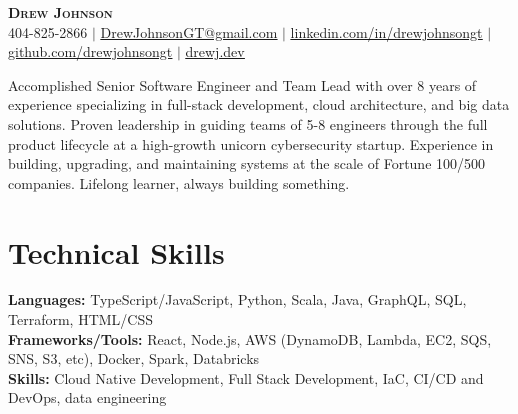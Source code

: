\documentclass[letterpaper,11pt]{article}
\newcommand{\overviewSection}[1]{%
  \begin{center}
    \small #1 \par
  \end{center}
}
\begin{document}

\begin{center}
	\textbf{\Huge \scshape Drew Johnson} \\ \vspace{1pt}
	\small 404-825-2866 $|$ \href{mailto:x@x.com}{\underline{DrewJohnsonGT@gmail.com}} $|$ 
	\href{https://linkedin.com/in/drewjohnsongt}{\underline{linkedin.com/in/drewjohnsongt}} $|$
	\href{https://github.com/drewjohnsongt}{\underline{github.com/drewjohnsongt}} $|$
	\href{https://drewj.dev/}{\underline{drewj.dev}}
\end{center}


\overviewSection {Accomplished Senior Software Engineer and Team Lead with over 8 years of experience specializing in full-stack development, cloud architecture, and big data solutions. Proven leadership in guiding teams of 5-8 engineers through the full product lifecycle at a high-growth unicorn cybersecurity startup. Experience in building, upgrading, and maintaining systems at the scale of Fortune 100/500 companies. Lifelong learner, always building something.}

\section{Technical Skills}
\begin{itemize}[leftmargin=0.15in, label={}]
	\small{\item{
		\textbf{Languages:}{ TypeScript/JavaScript, Python, Scala, Java, GraphQL, SQL, Terraform, HTML/CSS} \\
		\textbf{Frameworks/Tools:}{ React, Node.js, AWS (DynamoDB, Lambda, EC2, SQS, SNS, S3, etc), Docker, Spark, Databricks} \\
		\textbf{Skills:}{ Cloud Native Development, Full Stack Development, IaC, CI/CD and DevOps, data engineering}
        }}
\end{itemize}
 
\end{document}
